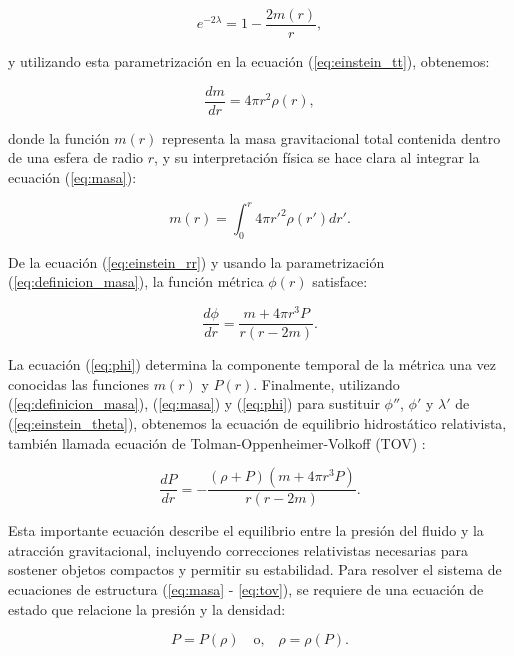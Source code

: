 \begin{equation}
	e^{-2\lambda} = 1 - \frac{2m(r)}{r},
	\label{eq:definicion_masa}
\end{equation}

y utilizando esta parametrización en la ecuación (\ref{eq:einstein_tt}), obtenemos:

\begin{equation}
	\frac{dm}{dr} = 4\pi r^2 \rho(r),
	\label{eq:masa}
\end{equation}

donde la función $m(r)$ representa la masa gravitacional total contenida dentro de una esfera de radio $r$, y su interpretación física se hace clara al integrar la ecuación (\ref{eq:masa}):

\begin{equation*}
	m(r) = \int_0^r 4\pi r'^2 \rho(r') dr'.
\end{equation*}

De la ecuación (\ref{eq:einstein_rr}) y usando la parametrización (\ref{eq:definicion_masa}), la función métrica $\phi(r)$ satisface:

\begin{equation}
	\frac{d\phi}{dr} = \frac{m + 4\pi r^3 P}{r(r - 2m)}.
	\label{eq:phi}
\end{equation}

La ecuación (\ref{eq:phi}) determina la componente temporal de la métrica una vez conocidas las funciones $m(r)$ y $P(r)$. Finalmente, utilizando (\ref{eq:definicion_masa}), (\ref{eq:masa}) y (\ref{eq:phi}) para sustituir $\phi''$, $\phi'$ y $\lambda'$ de (\ref{eq:einstein_theta}), obtenemos la ecuación de equilibrio hidrostático relativista, también llamada ecuación de Tolman-Oppenheimer-Volkoff (TOV) \cite{oppenheimerMassiveNeutronCores1939}:

\begin{equation}
	\frac{dP}{dr} = -\frac{(\rho + P)(m + 4\pi r^3 P)}{r(r - 2m)}.
	\label{eq:tov}
\end{equation}

Esta importante ecuación describe el equilibrio entre la presión del fluido y la atracción gravitacional, incluyendo correcciones relativistas necesarias para sostener objetos compactos \cite{oppenheimerMassiveNeutronCores1939} y permitir su estabilidad. Para resolver el sistema de ecuaciones de estructura (\ref{eq:masa} - \ref{eq:tov}), se requiere de una ecuación de estado que relacione la presión y la densidad:

\begin{equation}
	P = P(\rho) \quad \text{o,} \quad \rho = \rho(P).
	\label{eq:ecuacion_estado}
\end{equation}

